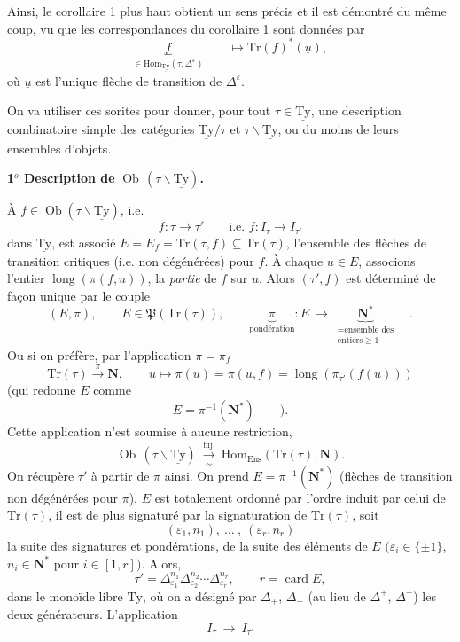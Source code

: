 \documentclass[11pt]{article}
\newcommand{\printedpage}[1]{\if\relax\detokenize{#1}\relax\else\marginpar{\raggedright\footnotesize p.~#1}\fi}
\newcommand{\msp}[1]{\marginpar{\raggedright\footnotesize [#1]}}
\newcommand{\Ob}{\operatorname{Ob}}
\newcommand{\Hom}{\mathrm{Hom}}
\newcommand{\uTy}{\underline{\mathrm{Ty}}}
\newcommand{\Tr}{\mathrm{Tr}}
\newcommand{\lng}{\operatorname{long}}
\newcommand{\card}{\operatorname{card}}
\begin{document}
\printedpage{28}

Ainsi, le corollaire 1 plus haut obtient un sens précis et il est démontré du même coup, vu que les correspondances du corollaire 1 sont données par
\[
\underbrace{f}_{\in \Hom_{\uTy}(\tau, \Delta^{\varepsilon})} \qquad \longmapsto \Tr(f)^*(\underline{u}),
\]
où $\underline{u}$ est l'unique flèche de transition de $\Delta^{\varepsilon}$.

On va utiliser ces sorites pour donner, pour tout $\tau \in \uTy$, une description combinatoire simple des catégories $\uTy/\tau$ et $\tau\backslash\uTy$, ou du moins de leurs ensembles d'objets.

\textbf{1$^o$ Description de} $\Ob\,(\tau\backslash\uTy)$\textbf{.}

À $f \in \Ob(\tau\backslash\uTy)$, i.e.
\[
f : \tau \longrightarrow \tau' \qquad \text{i.e. } f : I_\tau \longrightarrow I_{\tau'}
\]
dans $\uTy$, est associé $E = E_f = \Tr(\tau, f) \subseteq \Tr(\tau)$, l'ensemble des flèches de transition critiques (i.e. non dégénérées) pour $f$. À chaque $u \in E$, associons l'entier $\lng(\pi(f, u))$,
\msp{page 44}
la \textit{partie} de $f$ sur $u$. Alors $(\tau', f)$ est déterminé de façon unique par le couple
\[
(E, \pi), \qquad E \in \mathfrak{P}(\Tr(\tau)), \qquad \underbrace{\pi}_{\text{pondération}} : E \ \longrightarrow\ \underbrace{\mathbf{N}^*}_{\substack{= \text{ensemble des} \\ \text{entiers} \geq 1}} \quad .
\]
Ou si on préfère, par l'application $\pi = \pi_f$
\[
\Tr(\tau) \xrightarrow{\pi} \mathbf{N}, \qquad u \longmapsto \pi(u) = \pi(u, f) = \lng(\pi_{\tau'}(f(u)))
\]
(qui redonne $E$ comme
\[
E = \pi^{-1}(\mathbf{N}^*) \qquad ).
\]
Cette application n'est soumise à aucune restriction,
\[
\Ob\,(\tau\backslash\uTy) \ \xrightarrow[\sim]{\text{bij.}}\ \Hom_{\mathrm{Ens}}(\Tr(\tau), \mathbf{N}).
\]
On récupère $\tau'$ à partir de $\pi$ ainsi. On prend $E = \pi^{-1}(\mathbf{N}^*)$ (flèches de transition non dégénérées pour $\pi$), $E$ est totalement ordonné par l'ordre induit par celui de $\Tr(\tau)$, il est de plus signaturé par la signaturation de $\Tr(\tau)$, soit
\[
(\varepsilon_1, n_1),\ \dots\ ,\ (\varepsilon_r, n_r)
\]
la suite des signatures et pondérations, de la suite des éléments de $E$ $(\varepsilon_i \in \{\pm 1\}$, $n_i \in \mathbf{N}^*$ pour $i \in [1, r])$. Alors,
\[
\tau' = \Delta_{\varepsilon_1}^{n_1} \Delta_{\varepsilon_2}^{n_2} \cdots \Delta_{\varepsilon_r}^{n_r}, \qquad r = \card E,
\]
dans le monoïde libre $\mathrm{Ty}$, où on a désigné par $\Delta_+$, $\Delta_-$ (au lieu de $\Delta^+$, $\Delta^-$) les deux générateurs. L'application
\[
I_\tau \ \longrightarrow\ I_{\tau'}
\]
\end{document}
